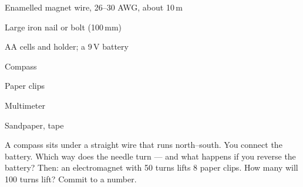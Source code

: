 



\begin{materials}
\item Enamelled magnet wire, 26--30 AWG, about 10\,m
\item Large iron nail or bolt (100\,mm)
\item AA cells and holder; a 9\,V battery
\item Compass
\item Paper clips
\item Multimeter
\item Sandpaper, tape
\end{materials}

\begin{predict}
A compass sits under a straight wire that runs north--south. You connect the
battery. Which way does the needle turn --- and what happens if you reverse the
battery? Then: an electromagnet with 50 turns lifts 8 paper clips. How many will
100 turns lift? Commit to a number.
\end{predict}

